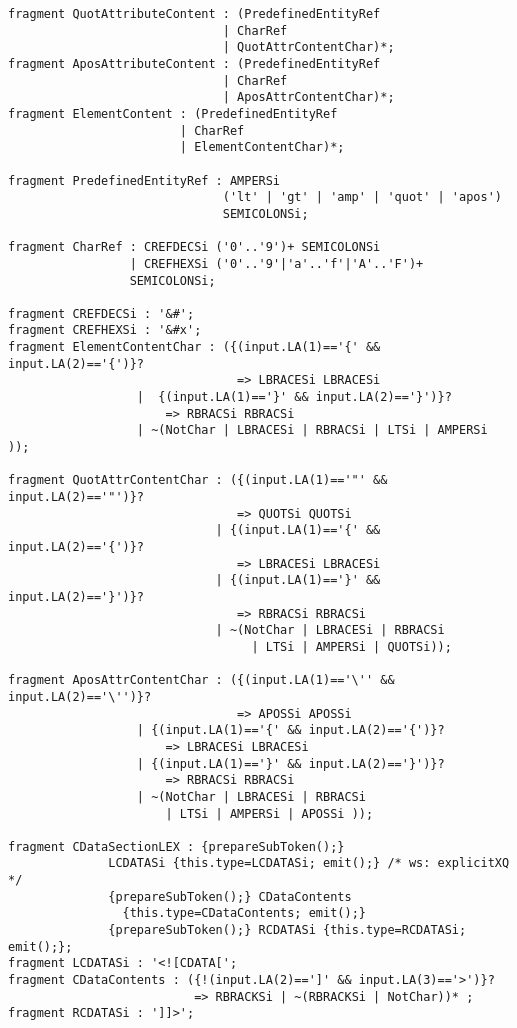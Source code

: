 \begin{verbatim}
fragment QuotAttributeContent : (PredefinedEntityRef 
                              | CharRef 
                              | QuotAttrContentChar)*;
fragment AposAttributeContent : (PredefinedEntityRef 
                              | CharRef 
                              | AposAttrContentChar)*;
fragment ElementContent : (PredefinedEntityRef 
                        | CharRef 
                        | ElementContentChar)*;

fragment PredefinedEntityRef : AMPERSi 
                              ('lt' | 'gt' | 'amp' | 'quot' | 'apos') 
                              SEMICOLONSi;
  
fragment CharRef : CREFDECSi ('0'..'9')+ SEMICOLONSi 
                 | CREFHEXSi ('0'..'9'|'a'..'f'|'A'..'F')+ 
                 SEMICOLONSi;

fragment CREFDECSi : '&#';
fragment CREFHEXSi : '&#x';
fragment ElementContentChar : ({(input.LA(1)=='{' && input.LA(2)=='{')}?
                                => LBRACESi LBRACESi 
                  |  {(input.LA(1)=='}' && input.LA(2)=='}')}?
                      => RBRACSi RBRACSi 
                  | ~(NotChar | LBRACESi | RBRACSi | LTSi | AMPERSi ));

fragment QuotAttrContentChar : ({(input.LA(1)=='"' && input.LA(2)=='"')}?
                                => QUOTSi QUOTSi
                             | {(input.LA(1)=='{' && input.LA(2)=='{')}?
                                => LBRACESi LBRACESi 
                             | {(input.LA(1)=='}' && input.LA(2)=='}')}?
                                => RBRACSi RBRACSi 
                             | ~(NotChar | LBRACESi | RBRACSi 
                                  | LTSi | AMPERSi | QUOTSi));

fragment AposAttrContentChar : ({(input.LA(1)=='\'' && input.LA(2)=='\'')}?
                                => APOSSi APOSSi
                  | {(input.LA(1)=='{' && input.LA(2)=='{')}?
                      => LBRACESi LBRACESi 
                  | {(input.LA(1)=='}' && input.LA(2)=='}')}?
                      => RBRACSi RBRACSi 
                  | ~(NotChar | LBRACESi | RBRACSi 
                      | LTSi | AMPERSi | APOSSi ));

fragment CDataSectionLEX : {prepareSubToken();}   
              LCDATASi {this.type=LCDATASi; emit();} /* ws: explicitXQ */
              {prepareSubToken();} CDataContents
                {this.type=CDataContents; emit();}
              {prepareSubToken();} RCDATASi {this.type=RCDATASi; emit();};
fragment LCDATASi : '<![CDATA[';
fragment CDataContents : ({!(input.LA(2)==']' && input.LA(3)=='>')}?
                          => RBRACKSi | ~(RBRACKSi | NotChar))* ;
fragment RCDATASi : ']]>';


\end{verbatim}
